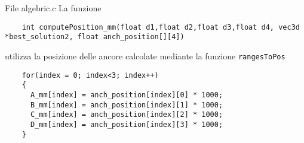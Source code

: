 \begin{frame}[fragile]{File algebric.c}
  La funzione
  \begin{lstlisting}
    int computePosition_mm(float d1,float d2,float d3,float d4, vec3d *best_solution2, float anch_position[][4])
  \end{lstlisting}
  utilizza la posizione delle ancore calcolate mediante la funzione \lstinline!rangesToPos!
  \begin{lstlisting}
    for(index = 0; index<3; index++)
    {
      A_mm[index] = anch_position[index][0] * 1000;
      B_mm[index] = anch_position[index][1] * 1000;
      C_mm[index] = anch_position[index][2] * 1000;
      D_mm[index] = anch_position[index][3] * 1000;
    }
  \end{lstlisting}
\end{frame}
